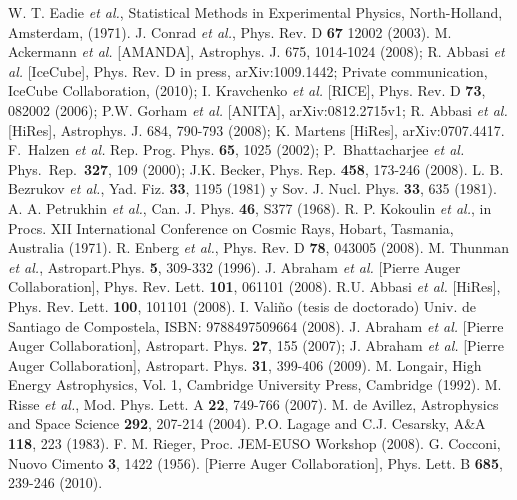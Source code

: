 \begin{thebibliography}{1}
 W. T. Eadie {\it et al.}, Statistical Methods in Experimental Physics, North-Holland, Amsterdam, (1971).
 J. Conrad {\it et al.}, Phys. Rev. D \textbf{67} 12002 (2003).
 M. Ackermann {\it et al.} [AMANDA], Astrophys. J. 675, 1014-1024 (2008); R. Abbasi {\it et al.} [IceCube], Phys. Rev. D in press, arXiv:1009.1442; Private communication, IceCube Collaboration, (2010); I. Kravchenko {\it et al.} [RICE], Phys. Rev. D {\bf 73}, 082002 (2006); P.W. Gorham {\it et al.} [ANITA], arXiv:0812.2715v1;
R. Abbasi {\it et al.} [HiRes], Astrophys. J. 684, 790-793 (2008); K. Martens [HiRes], arXiv:0707.4417.
 F.~Halzen {\sl et al.} Rep. Prog. Phys. {\bf 65}, 1025 (2002); P.~Bhattacharjee {\sl et al.} Phys.~Rep.~{\bf 327}, 109 (2000); J.K. Becker, Phys. Rep. {\bf 458}, 173-246 (2008). 
 L. B. Bezrukov {\sl et al.}, Yad. Fiz. \textbf{33}, 1195 (1981) y Sov. J. Nucl. Phys. \textbf{33}, 635 (1981).
 A. A. Petrukhin {\sl et al.}, Can. J. Phys. \textbf{46}, S377 (1968).
 R. P. Kokoulin {\sl et al.}, in Procs. XII International Conference on Cosmic Rays, Hobart, Tasmania, Australia (1971).
 R. Enberg {\sl et al.}, Phys. Rev. D \textbf{78}, 043005 (2008).
 M. Thunman {\sl et al.}, Astropart.Phys. \textbf{5}, 309-332 (1996).
 J. Abraham {\it et al.} [Pierre Auger Collaboration], Phys. Rev. Lett. \textbf{101}, 061101 (2008). R.U. Abbasi {\it et al.} [HiRes], Phys. Rev. Lett. \textbf{100}, 101101 (2008).
 I. Vali\~no (tesis de doctorado) Univ. de Santiago de Compostela, ISBN: 9788497509664 (2008).
 J. Abraham {\it et al.} [Pierre Auger Collaboration], Astropart. Phys. \textbf{27}, 155 (2007); J. Abraham {\it et al.} [Pierre Auger Collaboration], Astropart. Phys. {\bf 31}, 399-406 (2009).
 M. Longair, High Energy Astrophysics, Vol. 1, Cambridge University Press, Cambridge (1992).
 M. Risse {\it et al.}, Mod. Phys. Lett. A \textbf{22}, 749-766 (2007).
 M. de Avillez, Astrophysics and Space Science \textbf{292}, 207-214 (2004).
  P.O. Lagage and C.J. Cesarsky, A\&A \textbf{118}, 223 (1983).
 F. M. Rieger, Proc. JEM-EUSO Workshop (2008).
 G. Cocconi, Nuovo Cimento \textbf{3}, 1422  (1956).
 [Pierre Auger Collaboration], Phys. Lett. B \textbf{685}, 239-246 (2010).

\end{thebibliography}
